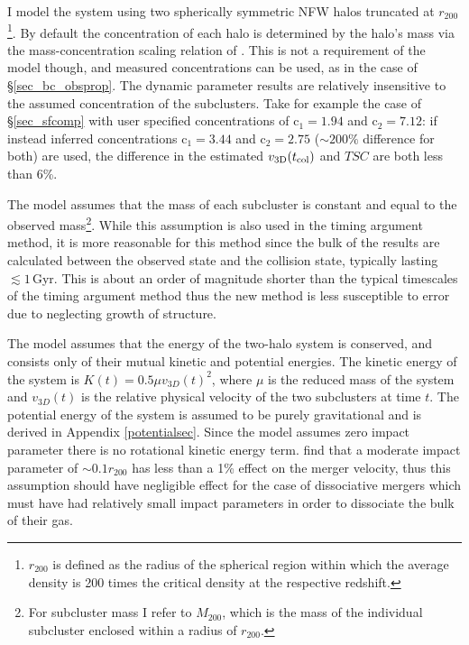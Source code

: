 \documentclass[12pt]{emulateapj}
\begin{document}
I model the system using two spherically symmetric NFW halos truncated at $r_{200}$\footnote{$r_{200}$ is defined as the radius of the spherical region within which the average density is 200 times the critical density at the respective redshift.}.  
By default the concentration of each halo is determined by the halo's mass via the mass-concentration scaling relation of \citet{Duffy:2008jy}.
This is not a requirement of the model though, and measured concentrations can be used, as in the case of \S\ref{sec_bc_obsprop}. 
The dynamic parameter results are relatively insensitive to the assumed concentration of the subclusters.  
Take for example the case of \S\ref{sec_sfcomp} with user specified concentrations of c$_1=1.94$ and c$_2=7.12$: if instead \citet{Duffy:2008jy} inferred concentrations c$_1=3.44$ and c$_2=2.75$ ($\sim200\%$ difference for both) are used, the difference in the estimated $v_{\rm 3D}(t_{\rm col})$ and $TSC$ are both less than 6\%.

The model assumes that the mass of each subcluster is constant and equal to the observed mass\footnote{For subcluster mass I refer to $M_{200}$, which is the mass of the individual subcluster enclosed within a radius of $r_{200}$.}.  
While this assumption is also used in the timing argument method, it is more reasonable for this method since the bulk of the results are calculated between the observed state and the collision state, typically lasting $\lesssim 1$\,Gyr.
This is about an order of magnitude shorter than the typical timescales of the timing argument method thus the new method is less susceptible to error due to neglecting growth of structure.

The model assumes that the energy of the two-halo system is conserved, and consists only of their mutual kinetic and potential energies.  
The kinetic energy of the system is $K(t) =  0.5 \mu v_{3D}(t)^2$, where $\mu$ is the reduced mass of the system and $v_{3D}(t)$ is the relative physical velocity of the two subclusters at time $t$.
The potential energy of the system is assumed to be purely gravitational and is derived in Appendix \ref{potentialsec}.
Since the model assumes zero impact parameter there is no rotational kinetic energy term.
\citet{Mastropietro:2008fs} find that a moderate impact parameter of $\sim0.1 r_{200}$ has less than a 1\% effect on the merger velocity, thus this assumption should have negligible effect for the case of dissociative mergers which must have had relatively small impact parameters in order to dissociate the bulk of their gas.
\end{document}
